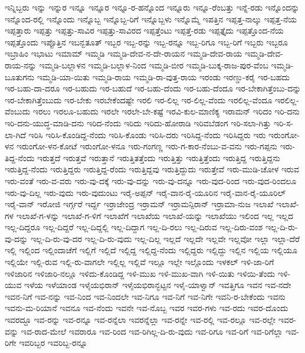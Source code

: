ಇನ್ನಿಬ್ಬರು
ಇನ್ನು
ಇನ್ನುರ
ಇನ್ನೂ
ಇನ್ನೂರ
ಇನ್ನೂ-ರ-ಹನ್ನೊಂದ
ಇನ್ನೂರು
ಇನ್ನೂ-ರೆಂಬತ್ತು
ಇನ್ನೆ-ರಡು
ಇನ್ನೊಂದನ್ನು
ಇನ್ನೊಂದ-ರಲ್ಲಿ
ಇನ್ನೊಂದು
ಇನ್ನೊಬ್ಬ
ಇನ್ನೊಬ್ಬ-ರಿಗೆ
ಇನ್ನೊಬ್ಬಳು
ಇನ್ನೊಮ್ಮೆ
ಇಪತ್ತಿನ
ಇಪ್ಪತ್ತ-ನಾಲ್ಕು
ಇಪ್ಪತ್ತ-ನೆಯ
ಇಪ್ಪತ್ತಾರು
ಇಪ್ಪತ್ತು
ಇಪ್ಪತ್ತು-ಸಾವಿರ
ಇಪ್ಪತ್ತು-ಸಾವಿರದ
ಇಪ್ಪತ್ತೆಂಟು
ಇಪ್ಪತ್ತೆ-ರಡು
ಇಪ್ಪತ್ತೈದು
ಇಪ್ಪತ್ತೊಂದ-ನೆಯ
ಇಪ್ಪತ್ತೊಂದು
ಇಪ್ಪೊತ್ತಿನ
ಇಬನ್ಬತೂತ್
ಇಬ್ಬರ
ಇಬ್ಬ-ರನ್ನು
ಇಬ್ಬ-ರನ್ನೂ
ಇಬ್ಬ-ರಿಗೂ
ಇಬ್ಬ-ರಿಗೆ
ಇಬ್ಬರು
ಇಬ್ಬರೂ
ಇಬ್ರಾಹಿಂ
ಇಭಾಟು
ಇಮಾಮ್
ಇಮ್ಮಡಿ
ಇಮ್ಮಡಿ-ದೇವ-ನ-ದೇ-ರಾಯನ
ಇಮ್ಮಡಿ-ದೇವ-ರಾಯ
ಇಮ್ಮಡಿ-ದೇವ-ರಾಯ-ನನ್ನು
ಇಮ್ಮಡಿ-ಬಲ್ಲಾಳನ
ಇಮ್ಮಡಿ-ಬಲ್ಲಾಳ-ನಿಂದ
ಇಮ್ಮಡಿ-ಬೀರ
ಇಮ್ಮಡಿ-ಬುಕ್ಕ-ರಾಜ-ಪುರ-ವೆಂಬ
ಇಮ್ಮಡಿ-ಬೂತುಗನು
ಇಮ್ಮಡಿ-ಯಾ-ಯಿತು
ಇಮ್ಮಡಿ-ರಾಯ
ಇಮ್ಮಡಿ-ರಾ-ವುತ್ತ-ರಾಯ
ಇರಂಡು
ಇರಣ್ಡು-ಕರೈ
ಇರ-ಬಹದು
ಇರ-ಬಹು-ದಾ-ದರೂ
ಇರ-ಬಹುದು
ಇರ-ಬಹುದೆ
ಇರ-ಬಹು-ದೆಂದು
ಇರ-ಬಹು-ದೆಂದೂ
ಇರ-ಬೇಕಾಗಿತ್ತೆಂಬು-ದನ್ನು
ಇರ-ಬೇಕಾಗಿತ್ತೆಂಬುದು
ಇರ-ಬೇಕು
ಇರಬೇಕೆಂದಷ್ಟೇ
ಇರಲಿ
ಇರ-ಲಿಲ್ಲ
ಇರ-ಲಿಲ್ಲ-ವೆಂದು
ಇರಲಿಲ್ಲ-ವೆಂದೂ
ಇರಲಿಲ್ಲ-ವೆಂಬುದು
ಇರಲು
ಇರಲೂ-ಬಹುದು
ಇರಲೇ
ಇರಲೇ-ಬೇ-ಕಷ್ಟೆ
ಇರವಿ-ಕುಲ-ಮಾಣಿಕ್ಯ
ಇರಾಮನ್
ಇರಿದಂ
ಇರಿ-ದನು
ಇರಿ-ದನು-ಯುದ್ಧ-ಮಾಡಿ-ದನು
ಇರಿದ-ನೆಂದು
ಇರಿದು
ಇರಿದು-ಹೋರಾಡಿ
ಇರಿವಬೆಡಂಗ
ಇರಿ-ಸಲಾ-ಗಿತ್ತು
ಇರಿ-ಸ-ಲಾ-ಗಿದೆ
ಇರಿಸಿ
ಇರಿಸಿ-ಕೊಂಡಿದ್ದ-ನೆಂದು
ಇರಿಸಿ-ಕೊಂಡು
ಇರಿಸಿ-ದರು
ಇರಿಸಿದ್ದ-ನೆಂದು
ಇರಿಸಿದ್ದರು
ಇರು
ಇರುಂಗೋ-ಳನ
ಇರುಂಗೋ-ಳನ-ಕೋಟೆ
ಇರುಂಗೋ-ಳನೂ
ಇರು-ಗಂಗಣ್ಣ
ಇರು-ಗ-ಕಾರ-ನೆಂಬು-ವ-ವನು
ಇರು-ಗಪ್ಪನು
ಇರು-ತಿದ್ದ-ನೆಂದು
ಇರುತ್ತದೆ
ಇರುತ್ತವೆ
ಇರುತ್ತಾನೆ
ಇರುತ್ತಿತತ್ತೆಂದು
ಇರುತ್ತಿತ್ತು
ಇರುತ್ತಿತ್ತೆಂದು
ಇರುತ್ತಿದ್ದ
ಇರುತ್ತಿದ್ದನು
ಇರುತ್ತಿದ್ದ-ನೆಂದು
ಇರುತ್ತಿದ್ದರು
ಇರುತ್ತಿದ್ದ-ರೆಂದು
ಇರುತ್ತಿದ್ದವು
ಇರುತ್ತಿದ್ದುದು
ಇರುತ್ತೇವೆ
ಇರು-ಮುಡಿ-ಚೋಳ
ಇರುವ
ಇರು-ವಂತೆ
ಇರು-ವ-ವರು
ಇರು-ವು-ದಕ್ಕೆ
ಇರು-ವು-ದನ್ನು
ಇರು-ವು-ದನ್ನೂ
ಇರು-ವುದ-ರಿಂದ
ಇರು-ವುದ-ರಿಂದಲೂ
ಇರು-ವು-ದಿಲ್ಲ
ಇರು-ವುದು
ಇರು-ವುದುಂಟು
ಇರೈ-ಅಪ್ಪನ್
ಇರೈ-ವಾನ-ರೈ-ಯೂರಿನ
ಇರೈ-ವಾನ-ರೈ-ಯೂರಿಲ್
ಇರೈ-ವಾನ್
ಇರೋಜಿ
ಇರ್ಗ್ಗರೆ
ಇರ್ದ್ದ
ಇರ್ರಾಜೇಂದ್ರ
ಇರ್ರಾಮನ್
ಇರ್ರಾಮನ್ಪಿರಾನ್
ಇರ್ರಾಮಾ-ನುಜ
ಇಲಾಖೆ
ಇಲಾಖೆ-ಗಳ
ಇಲಾಖೆ-ಗ-ಳನ್ನು
ಇಲಾಖೆ-ಗ-ಳಿಗೆ
ಇಲಾಖೆಗೆ
ಇಲಾಖೆಯ
ಇಲಾಖೆ-ಯನ್ನು
ಇಲಾಖೆಯು
ಇಲಿಂದ
ಇಲ್ಲ
ಇಲ್ಲದ
ಇಲ್ಲ-ದಿದ್ದರೂ
ಇಲ್ಲ-ದಿದ್ದರೆ
ಇಲ್ಲ-ದಿದ್ದಲ್ಲಿ
ಇಲ್ಲ-ದಿದ್ದಾಗ
ಇಲ್ಲ-ದಿ-ರಲು
ಇಲ್ಲ-ದಿರುವ
ಇಲ್ಲ-ದಿರು-ವಂಶ
ಇಲ್ಲ-ದಿ-ರು-ವು-ದನ್ನು
ಇಲ್ಲ-ದಿ-ರು-ವು-ದರ
ಇಲ್ಲ-ದಿ-ರು-ವುದು
ಇಲ್ಲ-ದಿಲ್ಲ
ಇಲ್ಲದೆ
ಇಲ್ಲದೇ
ಇಲ್ಲವೇ
ಇಲ್ಲವೋ
ಇಲ್ಲಾ
ಇಲ್ಲಾ-ದೆರೆ
ಇಲ್ಲಿ
ಇಲ್ಲಿಂದ
ಇಲ್ಲಿಂದಾಚೆಗೆ
ಇಲ್ಲಿಗೆ
ಇಲ್ಲಿದೆ
ಇಲ್ಲಿದ್ದ
ಇಲ್ಲಿದ್ದ-ನೆಂದು
ಇಲ್ಲಿದ್ದರು
ಇಲ್ಲಿದ್ದು
ಇಲ್ಲಿನ
ಇಲ್ಲಿಯ
ಇಲ್ಲಿಯೂ
ಇಲ್ಲಿಯೇ
ಇಲ್ಲಿ-ರುವ
ಇಲ್ಲಿ-ರು-ವಾಗಲೇ
ಇಲ್ಲಿಲ್ಲ
ಇಲ್ಲಿವೆ
ಇಲ್ಲೂ
ಇಲ್ಲೇ
ಇಲ್ಲೊಂದು
ಇಳಕಲ್
ಇಳಿ-ಜಾ-ರಿಗೆ
ಇಳಿಜಾರಿನ
ಇಳಿಜಾರಿ-ನಲ್ಲೂ
ಇಳಿದು-ಕೊಂಡಿದ್ದ
ಇಳಿ-ಮುಖ
ಇಳಿ-ಮುಖ-ವಾಗಿ
ಇಳಿ-ಯಿತು
ಇಳಿಯಿ-ತೆಂದು
ಇಳಿ-ಯುವ
ಇಳೆಯ
ಇಳೆಯಾಂಡ
ಇಳೈಯಭಿರಾನ್
ಇಳೈಯಭಿರಾನ್ಭಟ್ಟನ
ಇಳೈ-ಯಾಳ್ವಾನ್
ಇವತ್ತಿಗೂ
ಇವನ
ಇವ-ನದೇ
ಇವನ-ನಿಗೆ
ಇವ-ನನ್ನು
ಇವ-ನಿಂದ
ಇವ-ನಿಂದಲೇ
ಇವ-ನಿಗೂ
ಇವ-ನಿಗೆ
ಇವ-ನಿಗೇ
ಇವನಿ-ರ-ಬೇಕೆಂದು
ಇವನು
ಇವನು-ಮ-ರಿಯಾನೆ
ಇವನೂ
ಇವ-ನೆಂದು
ಇವನೇ
ಇವ-ನೊಬ್ಬ
ಇವರ
ಇವರ-ಗಳು
ಇವ-ರದು
ಇವರ-ದೊಂದು
ಇವರದ್ದೂ
ಇವ-ರನ್ನು
ಇವ-ರನ್ನೂ
ಇವ-ರನ್ನೆಲಾ
ಇವರನ್ನೆಲ್ಲಾ
ಇವ-ರನ್ನೇ
ಇವ-ರಲ್ಲಿ
ಇವ-ರಲ್ಲೂ
ಇವ-ರಲ್ಲೇ
ಇವರ-ವನ್ನು
ಇವ-ರಾದ-ಮೇಲೆ
ಇವರಾರೂ
ಇವ-ರಿಂದ
ಇವ-ರಿಗಿಲ್ಲ-ದಿ-ರು-ವುದು
ಇವ-ರಿಗೂ
ಇವ-ರಿಗೆ
ಇವ-ರಿಗೆಲ್ಲಾ
ಇವ-ರಿಗೇ
ಇವರಿಬ್ಬರ
ಇವರಿಬ್ಬ-ರನ್ನೂ
